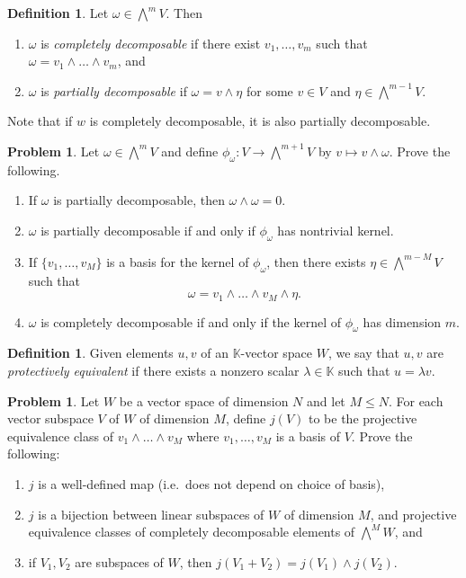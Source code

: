 \documentclass[letterpaper,11pt]{amsart}
\theoremstyle{plain}
\theoremstyle{definition}
\newtheorem{defn}[thm]{Definition}
\newtheorem{pr}[thm]{Problem}
\theoremstyle{remark}
\begin{document}
\begin{defn}
    Let $\omega \in \bigwedge^m V$. Then
    \begin{enumerate}
        \item $\omega$ is \emph{completely decomposable} if there exist $v_1,\dots,v_m$ such that $\omega = v_1 \wedge \dots \wedge v_m$, and
        \item $\omega$ is \emph{partially decomposable} if $\omega = v \wedge \eta$ for some $v \in V$ and $\eta \in \bigwedge^{m-1} V$.
    \end{enumerate}
    Note that if $w$ is completely decomposable, it is also partially decomposable.
\end{defn}

\begin{pr}
    Let $\omega \in \bigwedge^m V$ and define $\phi_\omega: V\rightarrow \bigwedge^{m+1}V$ by $v\mapsto v\wedge \omega$.
    Prove the following.
    \begin{enumerate}
        \item If $\omega$ is partially decomposable, then $\omega \wedge \omega = 0$.
        \item $\omega$ is partially decomposable if and only if $\phi_\omega$ has nontrivial kernel.
        \item If $\{v_1,\dots,v_M\}$ is a basis for the kernel of $\phi_\omega$, then there exists $\eta \in \bigwedge^{m-M} V$ such that
        \[
            \omega = v_1 \wedge \dots \wedge v_M \wedge \eta.
        \]
        \item $\omega$ is completely decomposable if and only if the kernel of $\phi_\omega$ has dimension $m$.
    \end{enumerate}
\end{pr}

\begin{defn}
    Given elements $u,v$ of an $\mathbb{K}$-vector space $W$, we say that $u,v$ are \emph{protectively equivalent} if there exists a nonzero scalar $\lambda \in \mathbb{K}$ such that $u = \lambda v$.
\end{defn}

\begin{pr}
    Let $W$ be a vector space of dimension $N$ and let $M \le N$.
    For each vector subspace $V$ of $W$ of dimension $M$, define $j(V)$ to be the projective equivalence class of
    $v_1 \wedge \dots \wedge v_M$ where $v_1,\dots,v_M$ is a basis of $V$.
    Prove the following:
    \begin{enumerate}
        \item $j$ is a well-defined map (i.e.~does not depend on choice of basis),
        \item $j$ is a bijection between linear subspaces of $W$ of dimension $M$, and projective equivalence classes of completely decomposable elements of $\bigwedge^M W$, and
        \item if $V_1,V_2$ are subspaces of $W$, then $j(V_1 + V_2) = j(V_1)\wedge j(V_2)$.
    \end{enumerate}
\end{pr}
\end{document}
